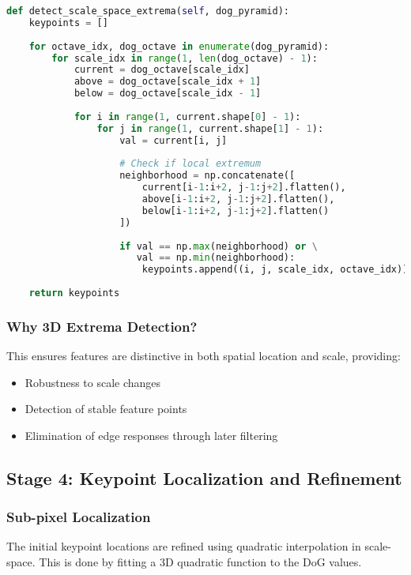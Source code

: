 \documentclass[12pt,a4paper]{article}
\begin{document}
\begin{lstlisting}[language=Python]
def detect_scale_space_extrema(self, dog_pyramid):
    keypoints = []
    
    for octave_idx, dog_octave in enumerate(dog_pyramid):
        for scale_idx in range(1, len(dog_octave) - 1):
            current = dog_octave[scale_idx]
            above = dog_octave[scale_idx + 1]
            below = dog_octave[scale_idx - 1]
            
            for i in range(1, current.shape[0] - 1):
                for j in range(1, current.shape[1] - 1):
                    val = current[i, j]
                    
                    # Check if local extremum
                    neighborhood = np.concatenate([
                        current[i-1:i+2, j-1:j+2].flatten(),
                        above[i-1:i+2, j-1:j+2].flatten(),
                        below[i-1:i+2, j-1:j+2].flatten()
                    ])
                    
                    if val == np.max(neighborhood) or \
                       val == np.min(neighborhood):
                        keypoints.append((i, j, scale_idx, octave_idx))
    
    return keypoints
\end{lstlisting}

\subsubsection{Why 3D Extrema Detection?}
This ensures features are distinctive in both spatial location and scale, providing:
\begin{itemize}
    \item Robustness to scale changes
    \item Detection of stable feature points
    \item Elimination of edge responses through later filtering
\end{itemize}

\subsection{Stage 4: Keypoint Localization and Refinement}

\subsubsection{Sub-pixel Localization}
The initial keypoint locations are refined using quadratic interpolation in scale-space. This is done by fitting a 3D quadratic function to the DoG values.
\end{document}

